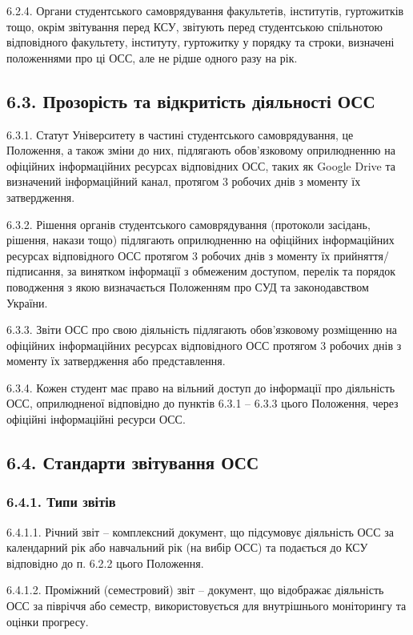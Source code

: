     6.2.4. Органи студентського самоврядування факультетів, інститутів, гуртожитків тощо, окрім звітування перед КСУ, звітують перед студентською спільнотою відповідного факультету, інституту, гуртожитку у порядку та строки, визначені положеннями про ці ОСС, але не рідше одного разу на рік.

\subsection*{6.3. Прозорість та відкритість діяльності ОСС}
    6.3.1. Статут Університету в частині студентського самоврядування, це Положення, а також зміни до них, підлягають обов'язковому оприлюдненню на офіційних інформаційних ресурсах відповідних ОСС, таких як Google Drive та визначений інформаційний канал, протягом 3 робочих днів з моменту їх затвердження.

    6.3.2. Рішення органів студентського самоврядування (протоколи засідань, рішення, накази тощо) підлягають оприлюдненню на офіційних інформаційних ресурсах відповідного ОСС протягом 3 робочих днів з моменту їх прийняття/підписання, за винятком інформації з обмеженим доступом, перелік та порядок поводження з якою визначається Положенням про СУД та законодавством України.

    6.3.3. Звіти ОСС про свою діяльність підлягають обов'язковому розміщенню на офіційних інформаційних ресурсах відповідного ОСС протягом 3 робочих днів з моменту їх затвердження або представлення.

    6.3.4. Кожен студент має право на вільний доступ до інформації про діяльність ОСС, оприлюдненої відповідно до пунктів 6.3.1 – 6.3.3 цього Положення, через офіційні інформаційні ресурси ОСС.

\subsection*{6.4. Стандарти звітування ОСС}
    \subsubsection*{6.4.1. Типи звітів}
        6.4.1.1. Річний звіт -- комплексний документ, що підсумовує діяльність ОСС за календарний рік або навчальний рік (на вибір ОСС) та подається до КСУ відповідно до п. 6.2.2 цього Положення.
        
        6.4.1.2. Проміжний (семестровий) звіт -- документ, що відображає діяльність ОСС за півріччя або семестр, використовується для внутрішнього моніторингу та оцінки прогресу.
        
